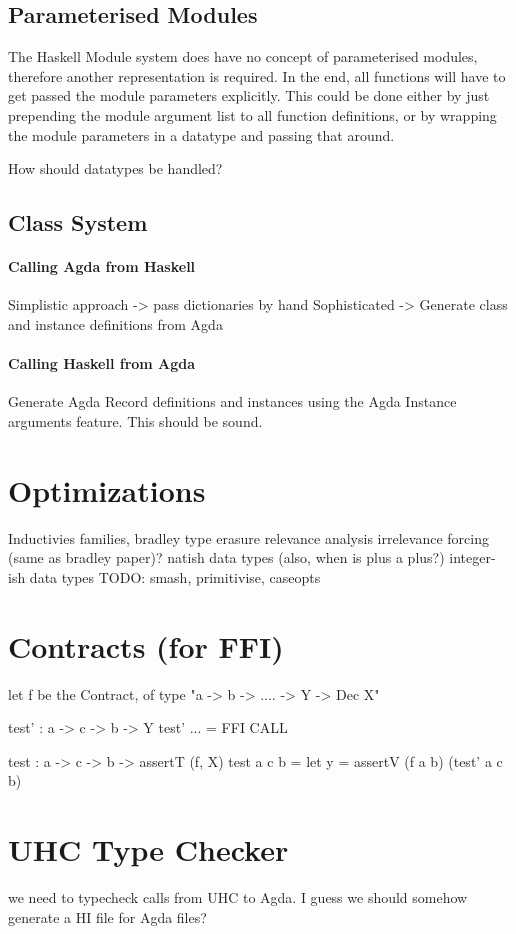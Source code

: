 \documentclass[12pt, a4paper, twoside]{report}
\begin{document}
\subsection{Parameterised Modules}
The Haskell Module system does have no concept of parameterised modules, therefore another representation is required. In the end,
all functions will have to get passed the module parameters explicitly. This could be done either by just prepending the module
argument list to all function definitions, or by wrapping the module parameters in a datatype and passing that around.

How should datatypes be handled?

\subsection{Class System}
\paragraph{Calling Agda from Haskell}
Simplistic approach -> pass dictionaries by hand
Sophisticated -> Generate class and instance definitions from Agda

\paragraph{Calling Haskell from Agda}
Generate Agda Record definitions and instances using the Agda Instance arguments feature.
This should be sound.

\section{Optimizations}
Inductivies families, bradley
type erasure
relevance analysis
irrelevance
forcing (same as bradley paper)?
natish data types (also, when is plus a plus?)
integer-ish data types
TODO: smash, primitivise, caseopts

\section{Contracts (for FFI)}

let f be the Contract, of type "a -> b -> .... -> Y -> Dec X"

test' : a -> c -> b -> Y
test' ... = FFI CALL

test : a -> c -> b -> assertT (f, X)
test a c b = let y = assertV (f a b) (test' a c b)

\section{UHC Type Checker}
we need to typecheck calls from UHC to Agda. I guess we should somehow generate a HI file for Agda files?
\end{document}
